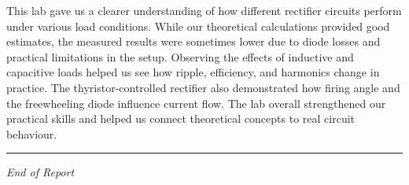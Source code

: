\documentclass[12pt,a4paper]{article}
\begin{document}
This lab gave us a clearer understanding of how different rectifier circuits perform under various load conditions. While our theoretical calculations provided good estimates, the measured results were sometimes lower due to diode losses and practical limitations in the setup. Observing the effects of inductive and capacitive loads helped us see how ripple, efficiency, and harmonics change in practice. The thyristor-controlled rectifier also demonstrated how firing angle and the freewheeling diode influence current flow. The lab overall strengthened our practical skills and helped us connect theoretical concepts to real circuit behaviour.
\newpage

\printbibliography

\vfill
\hrule
\begin{center}
\textit{End of Report}
\end{center}
\end{document}

